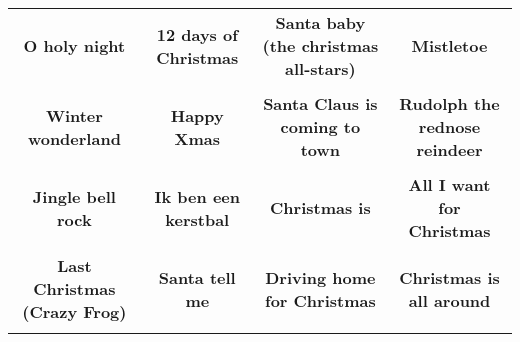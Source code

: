 \documentclass[12pt]{article} \usepackage{eso-pic, graphicx}
\newcommand{\background}[1]{%
\AddToShipoutPictureBG*{\texttt{[image: \#1]}}
}
\begin{document}
\tabcolsep=30.2pt \renewcommand{\arraystretch}{4.5}   \vspace*{4.3cm} \begin{center}  \begin{tabular}{c c c c}
\parbox{3cm}{\centering \textbf{O holy night}}& 
\parbox{3cm}{\centering \textbf{12 days of Christmas}}& 
\parbox{3cm}{\centering \textbf{Santa baby (the christmas all-stars)}}& 
\parbox{3cm}{\centering \textbf{Mistletoe}}\\ \\ 
\parbox{3cm}{\centering \textbf{Winter wonderland}}& 
\parbox{3cm}{\centering \textbf{Happy Xmas}}& 
\parbox{3cm}{\centering \textbf{Santa Claus is coming to town}}& 
\parbox{3cm}{\centering \textbf{Rudolph the rednose reindeer}}\\ \\ 
\parbox{3cm}{\centering \textbf{Jingle bell rock}}& 
\parbox{3cm}{\centering \textbf{Ik ben een kerstbal}}& 
\parbox{3cm}{\centering \textbf{Christmas is}}& 
\parbox{3cm}{\centering \textbf{All I want for Christmas}}\\ \\ 
\parbox{3cm}{\centering \textbf{Last Christmas (Crazy Frog)}}& 
\parbox{3cm}{\centering \textbf{Santa tell me}}& 
\parbox{3cm}{\centering \textbf{Driving home for Christmas}}& 
\parbox{3cm}{\centering \textbf{Christmas is all around}}\\ \\ 
\end{tabular} \background{discobingo.pdf} \end{center} 
\end{document}
